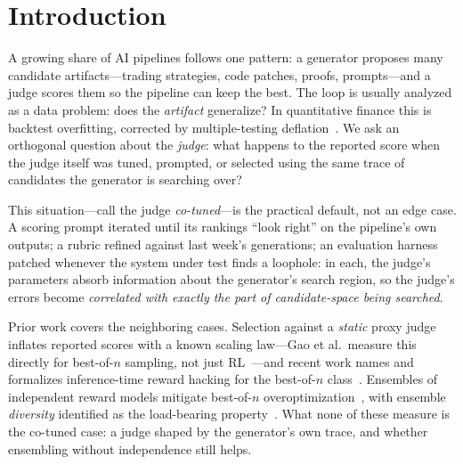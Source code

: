 \documentclass[sigconf]{acmart}
\begin{document}

\maketitle

\section{Introduction}
A growing share of AI pipelines follows one pattern: a generator proposes many candidate artifacts---trading strategies, code patches, proofs, prompts---and a judge scores them so the pipeline can keep the best. The loop is usually analyzed as a data problem: does the \emph{artifact} generalize? In quantitative finance this is backtest overfitting, corrected by multiple-testing deflation~\cite{bailey2014dsr,stw1999}. We ask an orthogonal question about the \emph{judge}: what happens to the reported score when the judge itself was tuned, prompted, or selected using the same trace of candidates the generator is searching over?

This situation---call the judge \emph{co-tuned}---is the practical default, not an edge case. A scoring prompt iterated until its rankings ``look right'' on the pipeline's own outputs; a rubric refined against last week's generations; an evaluation harness patched whenever the system under test finds a loophole: in each, the judge's parameters absorb information about the generator's search region, so the judge's errors become \emph{correlated with exactly the part of candidate-space being searched}.

Prior work covers the neighboring cases. Selection against a \emph{static} proxy judge inflates reported scores with a known scaling law---Gao et al.\ measure this directly for best-of-$n$ sampling, not just RL~\cite{gao2023}---and recent work names and formalizes inference-time reward hacking for the best-of-$n$ class~\cite{itrh2025}. Ensembles of independent reward models mitigate best-of-$n$ overoptimization~\cite{coste2024}, with ensemble \emph{diversity} identified as the load-bearing property~\cite{eisenstein2023}. What none of these measure is the co-tuned case: a judge shaped by the generator's own trace, and whether ensembling without independence still helps.
\end{document}
